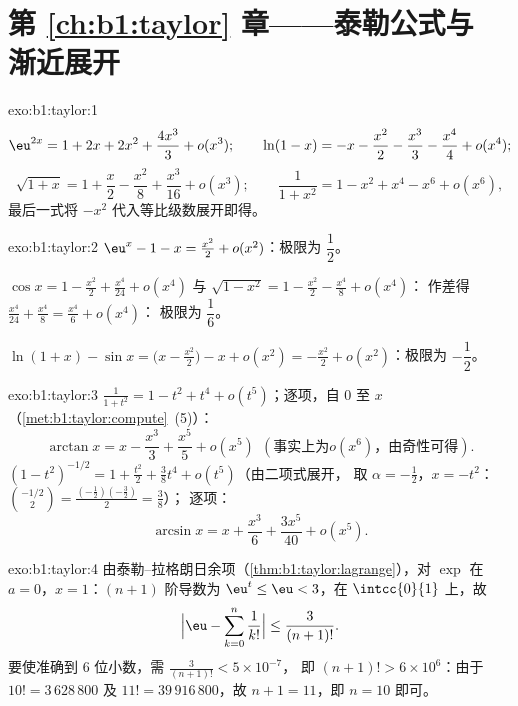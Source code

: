 \section*{第 \ref{ch:b1:taylor} 章——泰勒公式与
渐近展开}

\begin{solution}{exo:b1:taylor:1}
\[
\eu^{2x} = 1 + 2x + 2x^2 + \frac{4x^3}{3} + o(x^3);
\qquad
\ln(1 - x) = -x - \frac{x^2}{2} - \frac{x^3}{3} - \frac{x^4}{4} +
o(x^4);
\]
\[
\sqrt{1+x} = 1 + \frac x2 - \frac{x^2}{8} + \frac{x^3}{16} + o(x^3);
\qquad
\frac{1}{1 + x^2} = 1 - x^2 + x^4 - x^6 + o(x^6),
\]
最后一式将 $-x^2$ 代入等比级数展开即得。
\end{solution}

\begin{solution}{exo:b1:taylor:2}
$\eu^x - 1 - x = \frac{x^2}{2} + o(x^2)$：极限为 $\dfrac12$。

$\cos x = 1 - \frac{x^2}{2} + \frac{x^4}{24} + o(x^4)$ 与
$\sqrt{1 - x^2} = 1 - \frac{x^2}{2} - \frac{x^4}{8} + o(x^4)$：
作差得 $\frac{x^4}{24} + \frac{x^4}{8} = \frac{x^4}{6} + o(x^4)$：
极限为 $\dfrac16$。

$\ln(1+x) - \sin x = \bigl(x - \frac{x^2}{2}\bigr) - x + o(x^2) =
-\frac{x^2}{2} + o(x^2)$：极限为 $-\dfrac12$。
\end{solution}

\begin{solution}{exo:b1:taylor:3}
$\frac{1}{1+t^2} = 1 - t^2 + t^4 + o(t^5)$；逐项，自 $0$ 至
$x$（\cref{met:b1:taylor:compute}~(5)）：
\[
\arctan x = x - \frac{x^3}{3} + \frac{x^5}{5} + o(x^5)\ \ (\text{事实上为
}o(x^6)\text{，由奇性可得}).
\]
$(1 - t^2)^{-1/2} = 1 + \frac{t^2}{2} + \frac38 t^4 + o(t^5)$（由二项式展开，
取 $\alpha = -\frac12$，$x = -t^2$：
$\binom{-1/2}{2} = \frac{(-\frac12)(-\frac32)}{2} = \frac38$）；
逐项：
\[
\arcsin x = x + \frac{x^3}{6} + \frac{3x^5}{40} + o(x^5) .
\]
\end{solution}

\begin{solution}{exo:b1:taylor:4}
由泰勒–拉格朗日余项（\cref{thm:b1:taylor:lagrange}），对 $\exp$ 在 $a =
0$，$x = 1$：$(n+1)$ 阶导数为 $\eu^t \leq \eu < 3$，在
$\intcc{0}{1}$ 上，故
\[
\Bigl|\eu - \sum_{k=0}^{n} \frac{1}{k!}\Bigr| \leq
\frac{3}{(n+1)!} .
\]
要使准确到 $6$ 位小数，需 $\frac{3}{(n+1)!} < 5\times 10^{-7}$，
即 $(n+1)! > 6\times 10^{6}$：由于 $10! = 3\,628\,800$ 及 $11! =
39\,916\,800$，故 $n + 1 = 11$，即 $n = 10$ 即可。
\end{solution}

